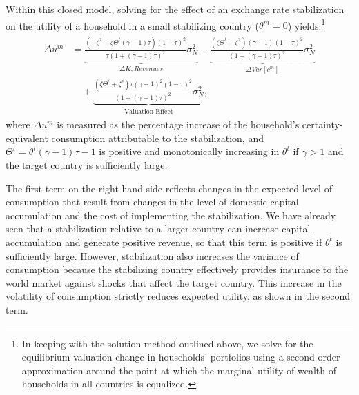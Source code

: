 \documentclass[12pt,letter]{article}
\theoremstyle{break} \theorembodyfont{\normalfont\itshape}
\theoremstyle{break}
\theoremstyle{break} \theorembodyfont{\normalfont\itshape}
\theoremstyle{break} \theorembodyfont{\normalfont\itshape}
\begin{document}
Within this closed model, solving for the effect of an exchange rate
stabilization on the utility of a household in a small stabilizing
country (\(\theta^m=0\)) yields:\footnote{In keeping with the solution
  method outlined above, we solve for the equilibrium valuation change
  in households' portfolios using a second-order approximation around
  the point at which the marginal utility of wealth of households in
  all countries is equalized.}
\begin{align}\begin{split}
    \Delta u^{m} & = \underbrace{ \frac{ (-\zeta^2 + \zeta
        \Theta^t(\gamma - 1) \tau)(1 - \tau)^2 }{\tau (1 + (\gamma -
        1) \tau)^2} \sigma_N^2}_{\Delta K,Revenues} - \underbrace{
      \frac{ (\zeta \Theta^t + \zeta^2)(\gamma - 1)(1 - \tau)^2
      }{(1 + (\gamma - 1) \tau)^2} \sigma_N^2}_{\Delta Var[c^m]} \\
    & \quad + \underbrace{ \frac{ (\zeta \Theta^t + \zeta^2) \tau
        (\gamma - 1)^2 (1- \tau)^2 }{\left( 1 + (\gamma - 1) \tau
        \right)^2} \sigma_N^2}_{\text{Valuation Effect}},
  \end{split}\label{eq:Deltau}\end{align}
where $\Delta u^{m}$ is measured as the percentage increase of the
household's certainty-equivalent consumption attributable to the
stabilization, and $\Theta^t=\theta^t (\gamma - 1) \tau - 1$ is
positive and monotonically increasing in \(\theta^t\) if $\gamma>1$
and the target country is sufficiently large.


The first term on the right-hand side reflects changes in the expected
level of consumption that result from changes in the level of domestic
capital accumulation and the cost of implementing the stabilization.
We have already seen that a stabilization relative to a larger country
can increase capital accumulation and generate positive revenue, so
that this term is positive if \(\theta^t\) is sufficiently large.
However, stabilization also increases the variance of consumption
because the stabilizing country effectively provides insurance to the
world market against shocks that affect the target country. This
increase in the volatility of consumption strictly reduces expected
utility, as shown in the second term.
\end{document}
